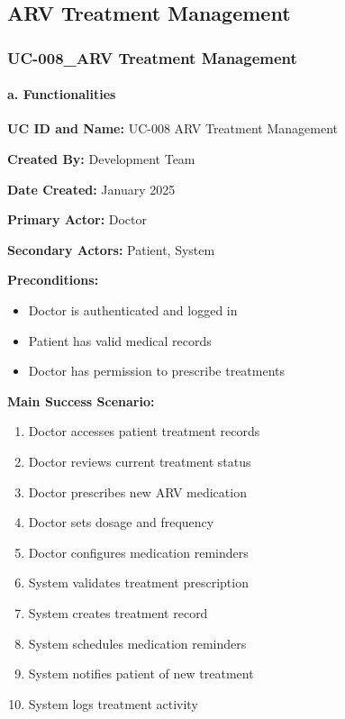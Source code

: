 \documentclass[12pt,a4paper]{article}
\begin{document}
\subsection{ARV Treatment Management}

\subsubsection{UC-008\_ARV Treatment Management}

\paragraph{a. Functionalities}

\textbf{UC ID and Name:} UC-008 ARV Treatment Management

\textbf{Created By:} Development Team

\textbf{Date Created:} January 2025

\textbf{Primary Actor:} Doctor

\textbf{Secondary Actors:} Patient, System

\textbf{Preconditions:}
\begin{itemize}
    \item Doctor is authenticated and logged in
    \item Patient has valid medical records
    \item Doctor has permission to prescribe treatments
\end{itemize}

\textbf{Main Success Scenario:}
\begin{enumerate}
    \item Doctor accesses patient treatment records
    \item Doctor reviews current treatment status
    \item Doctor prescribes new ARV medication
    \item Doctor sets dosage and frequency
    \item Doctor configures medication reminders
    \item System validates treatment prescription
    \item System creates treatment record
    \item System schedules medication reminders
    \item System notifies patient of new treatment
    \item System logs treatment activity
\end{enumerate}
\end{document}
